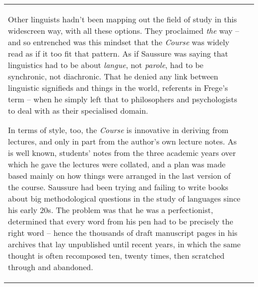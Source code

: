 \documentclass[12pt]{article}
\begin{document}
\begin{flushleft}
\begin{supertabular}{m{0.24415985in}m{5.89766in}}
Other linguists hadn’t been mapping out the field of study in this widescreen way, with all these options. They proclaimed \textit{the} way – and so entrenched was this mindset that the \textit{Course} was widely read as if it too fit that pattern. As if Saussure was saying that linguistics had to be about \textit{langue}, not \textit{parole}, had to be synchronic, not diachronic. That he denied any link between linguistic signifieds and things in the world, referents in Frege’s term – when he simply left that to philosophers and psychologists to deal with as their specialised domain. 

In terms of style, too, the \textit{Course} is innovative in deriving from lectures, and only in part from the author’s own lecture notes. As is well known, students’ notes from the three academic years over which he gave the lectures were collated, and a plan was made based mainly on how things were arranged in the last version of the course. Saussure had been trying and failing to write books about big methodological questions in the study of languages since his early 20s. The problem was that he was a perfectionist, determined that every word from his pen had to be precisely the right word – hence the thousands of draft manuscript pages in his archives that lay unpublished until recent years, in which the same thought is often recomposed ten, twenty times, then scratched through and abandoned. 


\end{supertabular}
\end{flushleft}
\end{document}
